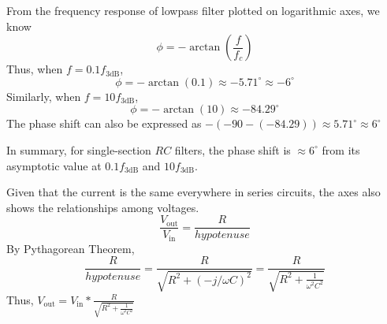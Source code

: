 From the frequency response of lowpass filter plotted on logarithmic axes, we know
\[\phi = -\arctan(\frac{f}{f_c})\]
Thus, when $f = 0.1f_\text{3dB}$, 
\[\phi = -\arctan(0.1) \approx -5.71 ^\circ \approx -6^\circ\]
Similarly, when $f = 10f_\text{3dB}$, 
\[\phi = -\arctan(10) \approx -84.29 ^\circ\]
The phase shift can also be expressed as $-(-90 - (-84.29)) \approx 5.71 ^\circ \approx 6^\circ $

In summary, for single-section $RC$ filters, the phase shift is $\approx 6^\circ$ from its asymptotic value at $0.1f_\text{3dB}$ and $10f_\text{3dB}$.

Given that the current is the same everywhere in series circuits, the axes also shows the relationships among voltages. 
\[\frac{V_\text{out}}{V_\text{in}} = \frac{R}{hypotenuse}\]
By Pythagorean Theorem, 
\[\frac{R}{hypotenuse} = \frac{R}{\sqrt{R^2 + (-j/\omega C)^2}} = \frac{R}{\sqrt{R^2 + \frac{1}{\omega^2 C^2}}}\]
Thus, $V_\text{out} = V_\text{in} * \frac{R}{\sqrt{R^2 + \frac{1}{\omega^2 C^2}}}$











